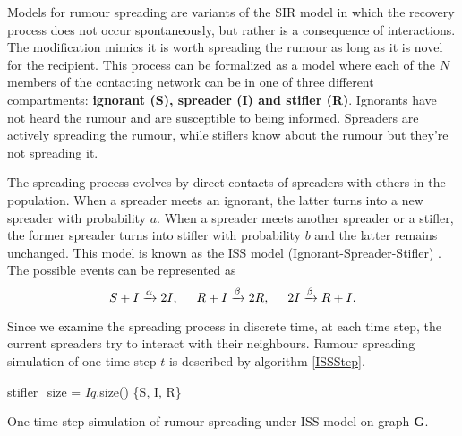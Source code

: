 \documentclass[times, utf8, diplomski]{fer}
\begin{document}
Models for rumour spreading are variants of the SIR model in which the recovery process does not occur spontaneously, but rather is a consequence of interactions. The modification mimics it is worth spreading the rumour as long as it is novel for the recipient. This process can be formalized as a model where each of the $N$ members of the contacting network can be in one of three different compartments: \textbf{ignorant (S), spreader (I) and stifler (R)}. Ignorants have not heard the rumour and are susceptible to being informed. Spreaders are actively spreading the rumour, while stiflers know about the rumour but they're not  spreading it.
 
The spreading process evolves by direct contacts of spreaders with others in the population. When a spreader meets an ignorant, the latter turns into a new spreader with probability $a$. When a spreader meets another spreader or a stifler, the former spreader turns into stifler with probability $b$ and the latter remains unchanged. This model is known as the ISS model (Ignorant-Spreader-Stifler) \cite{Moreno2004}. The possible events can be represented as 
\begin{equation*}
S + I \xrightarrow{\alpha} 2I,\hspace{5mm}  R + I \xrightarrow{\beta} 2R,  \hspace{5mm} 2I \xrightarrow{\beta} R + I.
\end{equation*}

Since we examine the spreading process in discrete time, at each time step, the current spreaders try to interact with their neighbours. Rumour spreading simulation of one time step $t$ is described by algorithm \ref{ISSStep}.

\vspace{10mm}

\begin{algorithm}[H]
 stifler\_size = $Iq$.size()\;
  \Return \{S, I, R\}
 \label{ISSStep}
 \caption{One time step simulation of rumour spreading under ISS model on graph $\mathbf{G}$.}
\end{algorithm}
\end{document}

